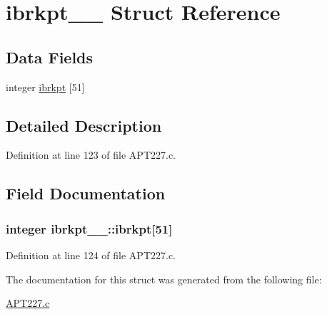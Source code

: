 \hypertarget{structibrkpt__1__}{}\section{ibrkpt\+\_\+\_\+ Struct Reference}
\label{structibrkpt__1__}
\subsection*{Data Fields}
\begin{DoxyCompactItemize}
\item 
integer \hyperlink{structibrkpt__1___a862a6daf28c3c0b375c016db14931957}{ibrkpt} \mbox{[}51\mbox{]}
\end{DoxyCompactItemize}


\subsection{Detailed Description}


Definition at line 123 of file A\+P\+T227.\+c.



\subsection{Field Documentation}
\subsubsection[{\texorpdfstring{ibrkpt}{ibrkpt}}]{\setlength{\rightskip}{0pt plus 5cm}integer ibrkpt\+\_\+\_\+\+::ibrkpt\mbox{[}51\mbox{]}}\hypertarget{structibrkpt__1___a862a6daf28c3c0b375c016db14931957}{}\label{structibrkpt__1___a862a6daf28c3c0b375c016db14931957}


Definition at line 124 of file A\+P\+T227.\+c.



The documentation for this struct was generated from the following file\+:\begin{DoxyCompactItemize}
\item 
\hyperlink{APT227_8c}{A\+P\+T227.\+c}\end{DoxyCompactItemize}
